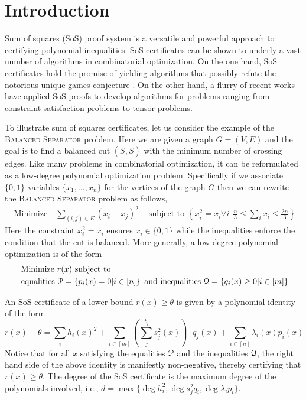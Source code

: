 \section{Introduction}
\label{sec:intro}

Sum of squares (SoS) proof system is a versatile and powerful approach to certifying polynomial inequalities. 
%
SoS certificates can be shown to underly a vast number of algorithms in combinatorial optimization. 
%
On the one hand, SoS certificates hold the promise of yielding algorithms that possibly refute the notorious unique games conjecture \cite{BBHKSZ12, barak2011rounding,GuruswamiS11}.  
%
On the other hand, a flurry of recent works have applied SoS proofs to develop algorithms for problems ranging from constraint satisfaction problems to tensor problems.  

To illustrate sum of squares certificates, let us consider the example of the
\textsc{Balanced Separator} problem.  Here we are given a graph $G = (V,E)$ and the goal is to find a balanced cut $(S,\overline{S})$ with the minimum number of crossing edges.
%
Like many problems in combinatorial optimization, it can be reformulated as a low-degree polynomial optimization problem.  
%
Specifically if we associate $\{0,1\}$ variables $\{x_1,\ldots,x_n\}$ for the vertices of the graph $G$ then we can rewrite the \textsc{Balanced Separator} problem as follows,
\begin{align*}
\text{ Minimize } \ \ \  \sum_{(i,j) \in E} (x_i-x_j)^2  \ \ \ \ \text{ subject to } \left\{ x_i^2 = x_i \forall i\ \ \frac{n}{3} \leq \sum_i x_i \leq \frac{2n}{3} \right\}
\end{align*} 
Here the constraint $x_i^2 = x_i$ ensures $x_i \in \{0,1\}$ while the inequalities enforce the condition that the cut is balanced. More generally, a low-degree polynomial optimization is of the form
\begin{align*}
&\text{ Minimize } r(x) \text{ subject to } \\ &\text{ equalities } \mathcal P = \left\{ p_i(x) = 0 | i \in [n] \right\} \text{ and inequalities } \mathcal Q = \left\{ q_i(x) \geq 0 | i \in [m] \right\}
\end{align*} 

An SoS certificate of a lower bound $ r(x) \geq \theta$ is given by a polynomial identity of the form
\[ r(x) - \theta  = \sum_{i} h_i(x)^2 + \sum_{i \in [m]} \left(\sum_{j}^{t_j} s_j^2(x) \right) \cdot q_j(x) + \sum_{i \in [n]} \lambda_i(x) p_i(x) \]
Notice that for all $x$ satisfying the equalities $\mathcal P$ and the inequalities $\mathcal Q$, the right hand side of the above identity is manifestly non-negative, thereby certifying that $r(x) \geq \theta$.  The degree of the SoS certificate is the maximum degree of the polynomials involved, i.e., $d = \max\{\deg h_i^2, \deg s_j^2 q_i, \deg \lambda_i p_i\}$.

